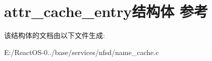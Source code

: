\hypertarget{structattr__cache__entry}{}\section{attr\+\_\+cache\+\_\+entry结构体 参考}
\label{structattr__cache__entry}


该结构体的文档由以下文件生成\+:\begin{DoxyCompactItemize}
\item 
E\+:/\+React\+O\+S-\/0../base/services/nfsd/name\+\_\+cache.\+c\end{DoxyCompactItemize}

